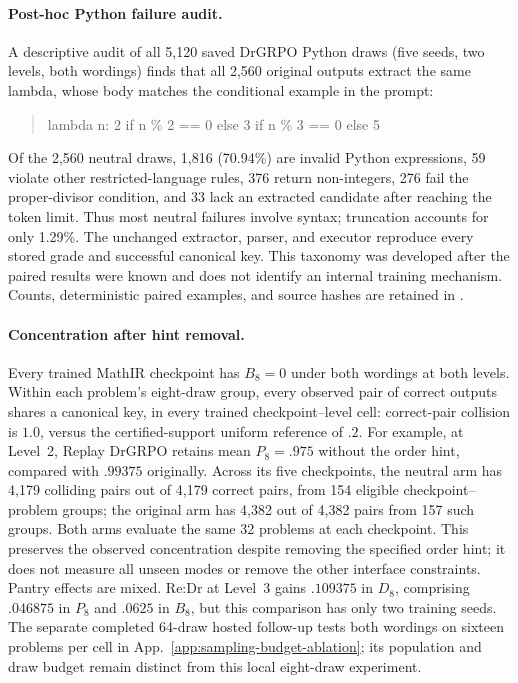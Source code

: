 \documentclass{article}
\newcommand{\1}{\mathbf 1}
\theoremstyle{remark}
\theoremstyle{definition}
\theoremstyle{plain}
\begin{document}
\paragraph{Post-hoc Python failure audit.}
A descriptive audit of all 5,120 saved DrGRPO Python draws (five seeds,
two levels, both wordings) finds that all 2,560 original outputs extract
the same lambda, whose body matches the conditional example in the prompt:
\begin{quote}\footnotesize\ttfamily
lambda n: 2 if n \% 2 == 0 else 3 if n \% 3 == 0 else 5
\end{quote}
Of the 2,560 neutral draws, 1,816 (70.94\%) are invalid Python expressions,
59 violate other restricted-language rules, 376 return non-integers,
276 fail the proper-divisor condition, and 33 lack an extracted candidate
after reaching the token limit. Thus most neutral failures involve syntax;
truncation accounts for only 1.29\%. The unchanged extractor, parser, and
executor reproduce every stored grade and successful canonical key.
This taxonomy was developed after the paired results were known and does
not identify an internal training mechanism. Counts, deterministic paired
examples, and source hashes are retained in
.

\paragraph{Concentration after hint removal.}
Every trained MathIR checkpoint has $B_8=0$ under both wordings at both levels.
Within each problem's eight-draw group, every observed pair of correct
outputs shares a canonical key, in every trained checkpoint--level cell:
correct-pair collision is $1.0$, versus the
certified-support uniform reference of $.2$. For example, at Level~2, Replay
DrGRPO retains mean $P_8=.975$ without the order hint, compared with $.99375$
originally. Across its five checkpoints, the neutral arm has 4,179 colliding
pairs out of 4,179 correct pairs, from 154 eligible checkpoint--problem
groups; the original arm has 4,382 out of 4,382 pairs from 157 such groups.
Both arms evaluate the same 32 problems at each checkpoint. This preserves
the observed concentration despite removing the specified order hint; it does
not measure all unseen modes or remove the other interface constraints.
Pantry effects are mixed. Re:Dr at Level~3 gains $.109375$ in $D_8$,
comprising $.046875$ in $P_8$ and $.0625$ in $B_8$, but this comparison has only
two training seeds. The separate completed 64-draw hosted follow-up
tests both wordings on sixteen problems per cell in
App.~\ref{app:sampling-budget-ablation}; its population and draw budget
remain distinct from this local eight-draw experiment.
\end{document}
